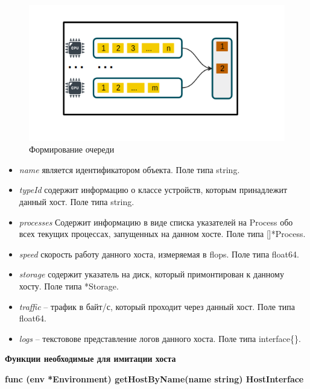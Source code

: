 \begin{figure}[t!]
	\centering
	\includegraphics[width=\textwidth]{Kenenbek/host_queue.png}
	\caption{Формирование очереди}
	\label{fig:hostqueue}
\end{figure}

\begin{itemize}
	
	\item \textit{name} является идентификатором объекта. Поле типа string.  

	\item \textit{typeId} содержит информацию о классе устройств, которым принадлежит данный хост. Поле типа string. 

\item \textit{processes} Содержит информацию в виде списка указателей на Process обо всех текущих процессах, запущенных на данном хосте. Поле типа []*Process. 

\item \textit{speed} скорость работу данного хоста, измеряемая в flops. Поле типа float64. 

\item \textit{storage} содержит указатель на диск, который примонтирован к данному хосту. Поле типа *Storage.

\item \textit{traffic} -- трафик в байт/с, который проходит через данный хост. Поле типа float64.

	\item \textit{logs} -- текстовове представление логов данного хоста. Поле типа interface\{\}.

\end{itemize}
\textbf{Функции необходимые для имитации хоста}

\textbf{func (env *Environment) getHostByName(name string) HostInterface}

